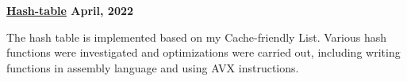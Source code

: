 \textbf{\href{https://github.com/jirol9xa/Hash-Table} {Hash-table} \hfill April, 2022}\par

\begin{itemize}
	The hash table is implemented based on my Cache-friendly List.  Various hash functions were investigated and optimizations were carried out, including writing functions in assembly language and using AVX instructions.
\end{itemize}\par